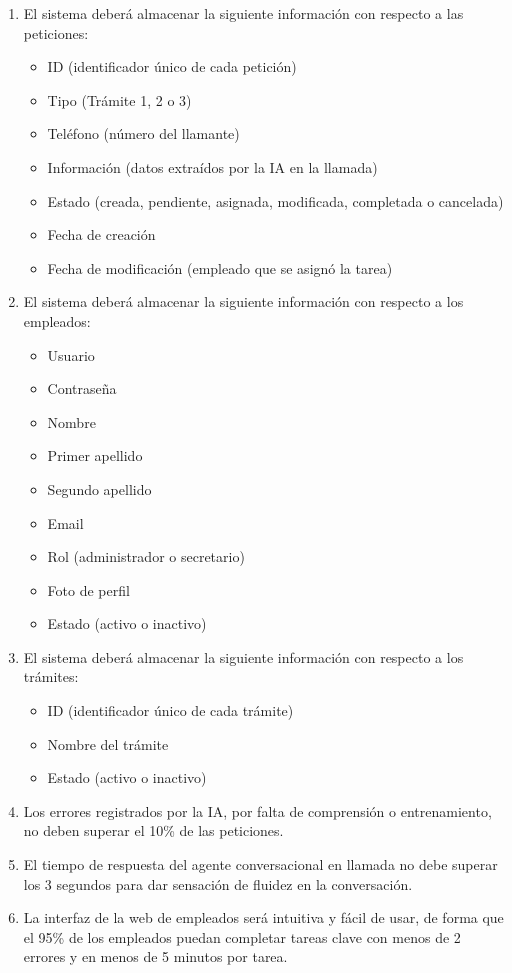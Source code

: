 \begin{enumerate}
        \item[RFI1.] El sistema deberá almacenar la siguiente información con respecto a las peticiones:
            \begin{itemize}
                \item ID (identificador único de cada petición)
                \item Tipo (Trámite 1, 2 o 3)
                \item Teléfono (número del llamante)
                \item Información (datos extraídos por la IA en la llamada) 
                \item Estado (creada, pendiente, asignada, modificada, completada o cancelada)
                \item Fecha de creación
                \item Fecha de modificación (empleado que se asignó la tarea)
            \end{itemize}
        \item[RFI2.] El sistema deberá almacenar la siguiente información con respecto a los empleados:
            \begin{itemize}
                \item Usuario
                \item Contraseña
                \item Nombre
                \item Primer apellido
                \item Segundo apellido
                \item Email
                \item Rol (administrador o secretario)
                \item Foto de perfil
                \item Estado (activo o inactivo)
            \end{itemize}
        \item[RFI3.] El sistema deberá almacenar la siguiente información con respecto a los trámites:
            \begin{itemize}
                \item ID (identificador único de cada trámite)
                \item Nombre del trámite
                \item Estado (activo o inactivo)
            \end{itemize}
                
        \item[RNF1.] Los errores registrados por la IA, por falta de comprensión o entrenamiento, no deben superar el 10\% de las peticiones.
        \item[RNF2.] El tiempo de respuesta del agente conversacional en llamada no debe superar los 3 segundos para dar sensación de fluidez en la conversación.
        \item[RNF3.] La interfaz de la web de empleados será intuitiva y fácil de usar, de forma que el 95\% de los empleados puedan completar tareas clave con menos de 2 errores y en menos de 5 minutos por tarea.
    \end{enumerate}

